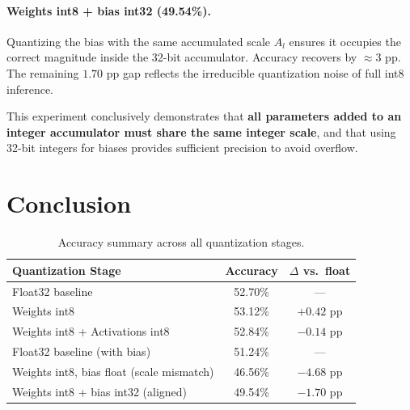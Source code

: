 \documentclass[11pt, letterpaper]{article}
\begin{document}
\paragraph{Weights int8 + bias int32 (49.54\%).}
Quantizing the bias with the same accumulated scale $A_l$ ensures it occupies
the correct magnitude inside the 32-bit accumulator. Accuracy recovers by
$\approx3$ pp. The remaining $1.70$ pp gap reflects the irreducible quantization
noise of full int8 inference.

This experiment conclusively demonstrates that \textbf{all parameters added to
an integer accumulator must share the same integer scale}, and that using 32-bit
integers for biases provides sufficient precision to avoid overflow.

\section{Conclusion}

\begin{table}[H]
  \centering
  \caption{Accuracy summary across all quantization stages.}
  \label{tab:summary}
  \begin{tabular}{lcc}
    \toprule
    \textbf{Quantization Stage}                    & \textbf{Accuracy} & \textbf{$\Delta$ vs.\ float} \\
    \midrule
    Float32 baseline                               & 52.70\%  & ---         \\
    Weights int8                                   & 53.12\%  & $+0.42$ pp  \\
    Weights int8 + Activations int8                & 52.84\%  & $-0.14$ pp  \\
    \midrule
    Float32 baseline (with bias)                   & 51.24\%  & ---         \\
    Weights int8, bias float (scale mismatch)      & 46.56\%  & $-4.68$ pp  \\
    Weights int8 + bias int32 (aligned)            & 49.54\%  & $-1.70$ pp  \\
    \bottomrule
  \end{tabular}
\end{table}
\end{document}
